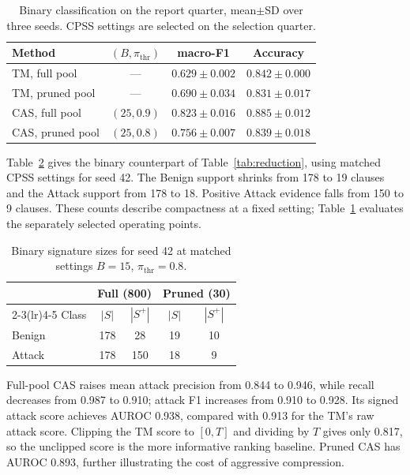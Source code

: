 \documentclass[conference]{IEEEtran}
\begin{document}
\begin{table}[!htb]
\centering
\caption{Binary classification on the report quarter, mean$\pm$SD
over three seeds. CPSS settings are selected on the selection quarter.}
\label{tab:binary}
\footnotesize
\setlength{\tabcolsep}{3pt}
\begin{tabular}{@{}lccc@{}}
\toprule
Method & $(B,\pi_{\mathrm{thr}})$ & macro-F1 & Accuracy \\
\midrule
TM, full pool & --- & $0.629\pm0.002$ & $0.842\pm0.000$ \\
TM, pruned pool & --- & $0.690\pm0.034$ & $0.831\pm0.017$ \\
CAS, full pool & $(25,0.9)$ & $\mathbf{0.823\pm0.016}$ & $\mathbf{0.885\pm0.012}$ \\
CAS, pruned pool & $(25,0.8)$ & $0.756\pm0.007$ & $0.839\pm0.018$ \\
\bottomrule
\end{tabular}
\end{table}

Table~\ref{tab:binary-reduction} gives the binary counterpart of
Table~\ref{tab:reduction}, using matched CPSS settings for seed 42.
The Benign support shrinks from 178 to 19 clauses and the Attack
support from 178 to 18. Positive Attack evidence falls from 150 to
9 clauses. These counts describe compactness at a fixed setting;
Table~\ref{tab:binary} evaluates the separately selected operating points.

\begin{table}[!htb]
\centering
\caption{Binary signature sizes for seed 42 at matched settings
$B=15$, $\pi_{\mathrm{thr}}=0.8$.}
\label{tab:binary-reduction}
\footnotesize
\begin{tabular}{@{}lcccc@{}}
\toprule
& \multicolumn{2}{c}{Full (800)} & \multicolumn{2}{c}{Pruned (30)} \\
\cmidrule(lr){2-3}\cmidrule(lr){4-5}
Class & $|S|$ & $|S^+|$ & $|S|$ & $|S^+|$ \\
\midrule
Benign & 178 & 28 & 19 & 10 \\
Attack & 178 & 150 & 18 & 9 \\
\bottomrule
\end{tabular}
\end{table}

Full-pool CAS raises mean attack precision from 0.844 to 0.946,
while recall decreases from 0.987 to 0.910; attack F1 increases from
0.910 to 0.928. Its signed attack score achieves AUROC 0.938,
compared with 0.913 for the TM's raw attack score. Clipping the TM
score to $[0,T]$ and dividing by $T$ gives only 0.817, so the
unclipped score is the more informative ranking baseline. Pruned CAS
has AUROC 0.893, further illustrating the cost of aggressive compression.
\end{document}
